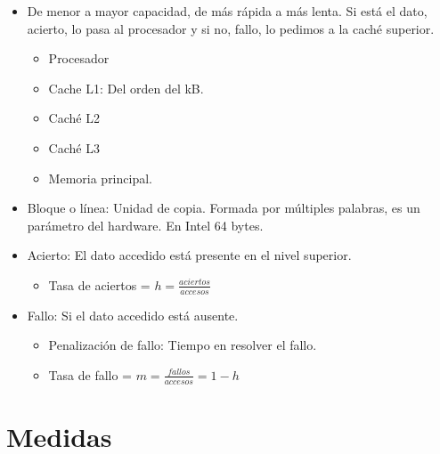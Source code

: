 \documentclass[12pt, twoside, openright]{report} %
\begin{document}
    \begin{itemize}
    
    \item
      De menor a mayor capacidad, de más rápida a más lenta. Si está el
      dato, acierto, lo pasa al procesador y si no, fallo, lo pedimos a
      la caché superior.

      \begin{itemize}
      
      \item
        Procesador
      \item
        Cache L1: Del orden del kB.
      \item
        Caché L2
      \item
        Caché L3
      \item
        Memoria principal.
      \end{itemize}
    \item
      Bloque o línea: Unidad de copia. Formada por múltiples palabras,
      es un parámetro del hardware. En Intel 64 bytes.
    \item
      Acierto: El dato accedido está presente en el nivel superior.

      \begin{itemize}
      
      \item
        Tasa de aciertos = \(h= \frac {aciertos} {accesos}\)
      \end{itemize}
    \item
      Fallo: Si el dato accedido está ausente.

      \begin{itemize}
      
      \item
        Penalización de fallo: Tiempo en resolver el fallo.
      \item
        Tasa de fallo = \(m= \frac {fallos} {accesos}=1-h\)
      \end{itemize}
    \end{itemize}
  \section{Medidas}
\end{document}
